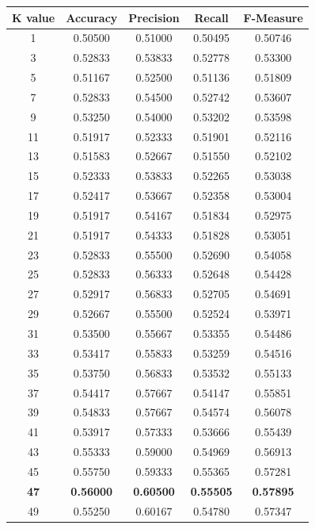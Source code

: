 \documentclass{article}
\begin{document}
\begin{center}
\begin{tabular}{ |c|c|c|c|c| }
	\hline
	\textbf{K value} & \textbf{Accuracy} & \textbf{Precision} & \textbf{Recall} & \textbf{F-Measure}\\
	\hline
	1 &  0.50500 &  0.51000 &  0.50495 &  0.50746 \\
    3 &  0.52833 &  0.53833 &  0.52778 &  0.53300 \\
    5 &  0.51167 &  0.52500 &  0.51136 &  0.51809 \\
    7 &  0.52833 &  0.54500 &  0.52742 &  0.53607 \\
    9 &  0.53250 &  0.54000 &  0.53202 &  0.53598 \\
    11 &  0.51917 &  0.52333 &  0.51901 &  0.52116 \\
    13 &  0.51583 &  0.52667 &  0.51550 &  0.52102 \\
    15 &  0.52333 &  0.53833 &  0.52265 &  0.53038 \\
    17 &  0.52417 &  0.53667 &  0.52358 &  0.53004 \\
    19 &  0.51917 &  0.54167 &  0.51834 &  0.52975 \\
    21 &  0.51917 &  0.54333 &  0.51828 &  0.53051 \\
    23 &  0.52833 &  0.55500 &  0.52690 &  0.54058 \\
    25 &  0.52833 &  0.56333 &  0.52648 &  0.54428 \\
    27 &  0.52917 &  0.56833 &  0.52705 &  0.54691 \\
    29 &  0.52667 &  0.55500 &  0.52524 &  0.53971 \\
    31 &  0.53500 &  0.55667 &  0.53355 &  0.54486 \\
    33 &  0.53417 &  0.55833 &  0.53259 &  0.54516 \\
    35 &  0.53750 &  0.56833 &  0.53532 &  0.55133 \\
    37 &  0.54417 &  0.57667 &  0.54147 &  0.55851 \\
    39 &  0.54833 &  0.57667 &  0.54574 &  0.56078 \\
    41 &  0.53917 &  0.57333 &  0.53666 &  0.55439 \\
    43 &  0.55333 &  0.59000 &  0.54969 &  0.56913 \\
    45 &  0.55750 &  0.59333 &  0.55365 &  0.57281 \\
    \textbf{47} &  \textbf{0.56000} &  \textbf{0.60500} &  \textbf{0.55505} &  \textbf{0.57895} \\
    49 &  0.55250 &  0.60167 &  0.54780 &  0.57347 \\

\end{tabular}
\end{center}
\end{document}

